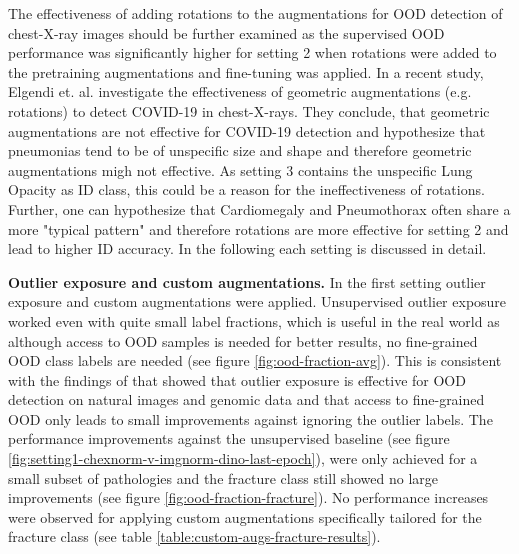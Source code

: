 The effectiveness of adding rotations to the augmentations for OOD detection of chest-X-ray images should be further examined as the supervised OOD performance was significantly higher for setting 2 when rotations were added to the pretraining augmentations and fine-tuning was applied.
In a recent study, Elgendi et. al. \citep{Elgendi2021} investigate the effectiveness of geometric augmentations (e.g. rotations) to detect COVID-19 in chest-X-rays.
They conclude, that geometric augmentations are not effective for COVID-19 detection and hypothesize \citep{Elgendi2021} that pneumonias tend to be of unspecific size and shape and therefore geometric augmentations migh not effective.
As setting 3 contains the unspecific Lung Opacity as ID class, this could be a reason for the ineffectiveness of rotations.
Further, one can hypothesize that Cardiomegaly and Pneumothorax often share a more "typical pattern" and therefore rotations are more effective for setting 2 and lead to higher ID accuracy.
In the following each setting is discussed in detail.
\par
\textbf{Outlier exposure and custom augmentations.}
In the first setting outlier exposure and custom augmentations were applied.
Unsupervised outlier exposure worked even with quite small label fractions, which is useful in the real world as although access to OOD samples is needed for better results, no fine-grained OOD class labels are needed (see figure \ref{fig:ood-fraction-avg}).
This is consistent with the findings of \citep{Fort2021} that showed that outlier exposure is effective for OOD detection on natural images and genomic data and that access to fine-grained OOD only leads to small improvements against ignoring the outlier labels.
The performance improvements against the unsupervised baseline (see figure \ref{fig:setting1-chexnorm-v-imgnorm-dino-last-epoch}), were only achieved for a small subset of pathologies and the fracture class still showed no large improvements (see figure \ref{fig:ood-fraction-fracture}).
No performance increases were observed for applying custom augmentations specifically tailored for the fracture class (see table \ref{table:custom-augs-fracture-results}).
